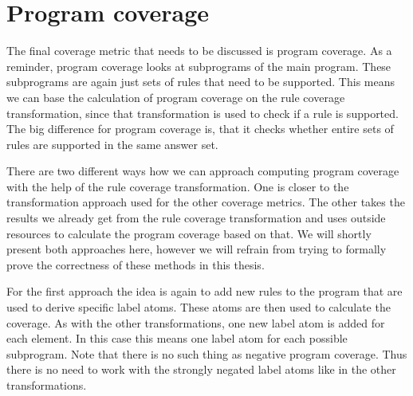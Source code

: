 \begin{comment}
- $\_ci$ label for every strongly connected component i

- find sccs same way as loops

- construct new rules same way as for loops: $\_ci :- \_dm, ... , \_dn$.

-> $\_ci$ in answer set <=> scc i is positively covered

- HOWEVER! $\_ci$ not in answer set -/> scc i is negatively covered! (see definition of component coverage)

-> add additional rules to program: $\_nsi :- not \_dm, ..., not \_dn$.

- if NONE of the atoms $a_m$ to $a_n$ are defined (aka definition covered), scc i is negatively covered and $\_nsi$ will be in the anser set

-> $\_nsi$ in answer set <=> scc i is negatively covered
\end{comment}

\section{Program coverage}
\label{sec:Computing coverage metrics for propositional programs/Program coverage}
The final coverage metric that needs to be discussed is program coverage. As a reminder, program coverage looks at subprograms of the main program. These subprograms are again just sets of rules that need to be supported. This means we can base the calculation of program coverage on the rule coverage transformation, since that transformation is used to check if a rule is supported. The big difference for program coverage is, that it checks whether entire sets of rules are supported in the same answer set. 

There are two different ways how we can approach computing program coverage with the help of the rule coverage transformation. One is closer to the transformation approach used for the other coverage metrics. The other takes the results we already get from the rule coverage transformation and uses outside resources to calculate the program coverage based on that. We will shortly present both approaches here, however we will refrain from trying to formally prove the correctness of these methods in this thesis.

For the first approach the idea is again to add new rules to the program that are used to derive specific label atoms. These atoms are then used to calculate the coverage. As with the other transformations, one new label atom is added for each element. In this case this means one label atom for each possible subprogram. Note that there is no such thing as negative program coverage. Thus there is no need to work with the strongly negated label atoms like in the other transformations.


